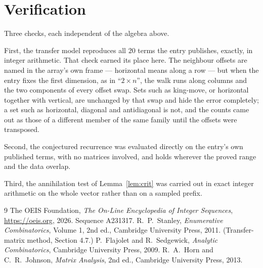 \documentclass[11pt,a4paper]{article}
\theoremstyle{plain}
\theoremstyle{definition}
\begin{document}
\section{Verification}

Three checks, each independent of the algebra above.

First, the transfer model reproduces all $20$ terms the entry publishes, exactly, in
integer arithmetic. That check earned its place here. The neighbour offsets are named in the
array's own frame --- horizontal means along a row --- but when the entry fixes the first
dimension, as in ``$2\times n$'', the walk runs along columns and the two components of every
offset swap. Sets such as king-move, or horizontal together with vertical, are unchanged by
that swap and hide the error completely; a set such as horizontal, diagonal and antidiagonal
is not, and the counts came out as those of a different member of the same family until the
offsets were transposed.

Second, the conjectured recurrence was evaluated directly on the entry's own published terms,
with no matrices involved, and holds wherever the proved range and the data overlap.

Third, the annihilation test of Lemma~\ref{lem:crit} was carried out in exact integer
arithmetic on the whole vector rather than on a sampled prefix.

\begin{thebibliography}{9}
 The OEIS Foundation, \emph{The On-Line Encyclopedia of Integer
Sequences}, \url{https://oeis.org}, 2026. Sequence A231317.
 R.~P.~Stanley, \emph{Enumerative Combinatorics}, Volume 1, 2nd ed.,
Cambridge University Press, 2011. (Transfer-matrix method, Section 4.7.)
 P.~Flajolet and R.~Sedgewick, \emph{Analytic Combinatorics}, Cambridge
University Press, 2009.
 R.~A.~Horn and C.~R.~Johnson, \emph{Matrix Analysis}, 2nd ed., Cambridge
University Press, 2013.
\end{thebibliography}
\end{document}

